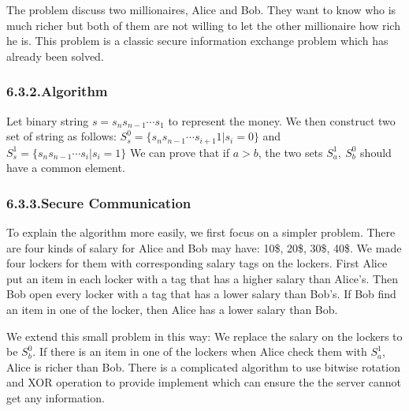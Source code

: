 \documentclass{article}
\begin{document}
\noindent{}The problem discuss two millionaires, Alice and Bob. They want to know who is much richer but both of them are not willing to let the other millionaire how rich he is. This problem is a classic secure information exchange problem which has already been solved.%

\subsubsection{6.3.2.\hspace*{0.5em}Algorithm}\label{sec-algorithm}%

\noindent{}Let binary string $s=s_ns_{n-1}\cdots s_1$ to represent the money. We then construct two set of string as follows:
$S_s^0=\{s_ns_{n-1}\cdots s_{i+1}1|s_i=0\}$
 and $S_s^1=\{s_ns_{n-1}\cdots s_{i}|s_i=1\}$
We can prove that if $a>b$, the two sets $S_a^1,\ S_b^0$ should have a common element.%

\subsubsection{6.3.3.\hspace*{0.5em}Secure Communication}\label{sec-secure-communication}%

\noindent{}To explain the algorithm more easily, we first focus on a simpler problem. There are four kinds of salary for Alice and Bob may have: 10\$, 20\$, 30\$, 40\$. We made four lockers for them with corresponding salary tags on the lockers. First Alice put an item in each locker with a tag that has a higher salary than Alice's. Then Bob open every locker with a tag that has a lower salary than Bob's. If Bob find an item in one of the locker, then Alice has a lower salary than Bob.%

We extend this small problem in this way: We replace the salary on the lockers to be $S_b^0$.
If there is an item in one of the lockers when Alice check them with $S_a^1$, Alice is richer than Bob.
There is a complicated algorithm to use bitwise rotation and XOR operation to provide implement which can ensure the the server cannot get any information.%
\end{document}
